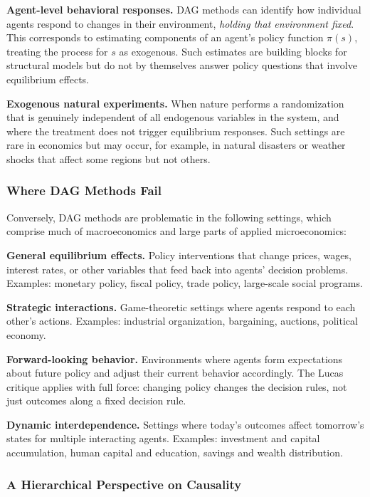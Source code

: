 \documentclass[12pt]{article}
\begin{document}
\textbf{Agent-level behavioral responses.} DAG methods can identify how individual agents respond to changes in their environment, \emph{holding that environment fixed}. This corresponds to estimating components of an agent's policy function $\pi(s)$, treating the process for $s$ as exogenous. Such estimates are building blocks for structural models but do not by themselves answer policy questions that involve equilibrium effects.

\textbf{Exogenous natural experiments.} When nature performs a randomization that is genuinely independent of all endogenous variables in the system, and where the treatment does not trigger equilibrium responses. Such settings are rare in economics but may occur, for example, in natural disasters or weather shocks that affect some regions but not others.

\subsubsection{Where DAG Methods Fail}

Conversely, DAG methods are problematic in the following settings, which comprise much of macroeconomics and large parts of applied microeconomics:

\textbf{General equilibrium effects.} Policy interventions that change prices, wages, interest rates, or other variables that feed back into agents' decision problems. Examples: monetary policy, fiscal policy, trade policy, large-scale social programs.

\textbf{Strategic interactions.} Game-theoretic settings where agents respond to each other's actions. Examples: industrial organization, bargaining, auctions, political economy.

\textbf{Forward-looking behavior.} Environments where agents form expectations about future policy and adjust their current behavior accordingly. The Lucas critique applies with full force: changing policy changes the decision rules, not just outcomes along a fixed decision rule.

\textbf{Dynamic interdependence.} Settings where today's outcomes affect tomorrow's states for multiple interacting agents. Examples: investment and capital accumulation, human capital and education, savings and wealth distribution.

\subsubsection{A Hierarchical Perspective on Causality}
\end{document}
